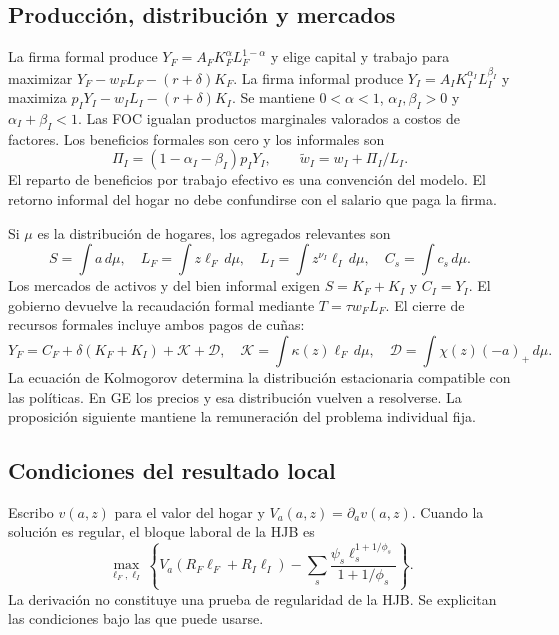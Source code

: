 \documentclass[11pt]{article}
\theoremstyle{definition}
\newcommand{\Va}{V_a}
\begin{document}
\subsection{Producción, distribución y mercados}
La firma formal produce \(Y_F=A_FK_F^\alpha L_F^{1-\alpha}\) y elige capital y trabajo para maximizar \(Y_F-w_FL_F-(r+\delta)K_F\). La firma informal produce \(Y_I=A_IK_I^{\alpha_I}L_I^{\beta_I}\) y maximiza \(p_IY_I-w_IL_I-(r+\delta)K_I\). Se mantiene \(0<\alpha<1\), \(\alpha_I,\beta_I>0\) y \(\alpha_I+\beta_I<1\). Las FOC igualan productos marginales valorados a costos de factores. Los beneficios formales son cero y los informales son
\[
\Pi_I=(1-\alpha_I-\beta_I)p_IY_I,\qquad
\widetilde w_I=w_I+\Pi_I/L_I.
\]
El reparto de beneficios por trabajo efectivo es una convención del modelo. El retorno informal del hogar no debe confundirse con el salario que paga la firma.

Si \(\mu\) es la distribución de hogares, los agregados relevantes son
\[
S=\int a\,d\mu,\quad
L_F=\int z\ell_F\,d\mu,\quad
L_I=\int z^{\nu_I}\ell_I\,d\mu,\quad
C_s=\int c_s\,d\mu .
\]
Los mercados de activos y del bien informal exigen \(S=K_F+K_I\) y \(C_I=Y_I\). El gobierno devuelve la recaudación formal mediante \(T=\tau w_FL_F\). El cierre de recursos formales incluye ambos pagos de cuñas:
\begin{equation}\label{eq:formal_resources}
Y_F=C_F+\delta(K_F+K_I)+\mathcal K+\mathcal D,\quad
\mathcal K=\int\kappa(z)\ell_F\,d\mu,\quad
\mathcal D=\int\chi(z)(-a)_+\,d\mu .
\end{equation}
La ecuación de Kolmogorov determina la distribución estacionaria compatible con las políticas. En GE los precios y esa distribución vuelven a resolverse. La proposición siguiente mantiene la remuneración del problema individual fija.

\subsection{Condiciones del resultado local}
Escribo \(v(a,z)\) para el valor del hogar y \(\Va(a,z)=\partial_av(a,z)\). Cuando la solución es regular, el bloque laboral de la HJB es
\begin{equation}\label{eq:hoursblock}
\max_{\ell_F,\ell_I}
\left\{\Va(R_F\ell_F+R_I\ell_I)-
\sum_s\frac{\psi_s\ell_s^{1+1/\phi_s}}{1+1/\phi_s}\right\}.
\end{equation}
La derivación no constituye una prueba de regularidad de la HJB. Se explicitan las condiciones bajo las que puede usarse.
\end{document}
